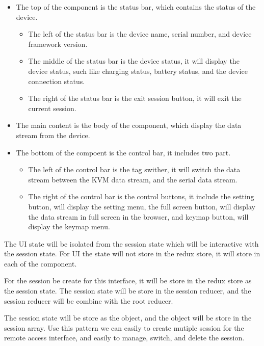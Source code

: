 \begin{itemize}
    \item The top of the component is the status bar, which contains the status of the device.
    \begin{itemize}
        \item The left of the status bar is the device name, serial number, and device framework version.
        \item The middle of the status bar is the device status, it will display the device status, 
        such like charging status, battery status, and the device connection status.
        \item The right of the status bar is the exit session button, it will exit the current session.
    \end{itemize}
    \item The main content is the body of the component, which display the data stream from the device.
    \item The bottom of the compoent is the control bar, it includes two part.
    \begin{itemize}
        \item The left of the control bar is the tag swither, it will switch the data stream between the
        KVM data stream, and the serial data stream.
        \item The right of the control bar is the control buttons, it include the setting button, 
        will display the setting menu, the full screen button, will display the data stream in full screen
        in the browser, and keymap button, will display the keymap menu.
    \end{itemize}
\end{itemize}

The UI state will be isolated from the session state which will be interactive with the session state.
For UI the state will not store in the redux store, it will store in each of the component.

For the session be create for this interface, it will be store in the redux store as the session state.
The session state will be store in the session reducer, and the session reducer will be combine with
the root reducer. 

The session state will be store as the object, and the object will be store in the session array.
Use this pattern we can easily to create mutiple session for the remote access interface, and easily to 
manage, switch, and delete the session.

